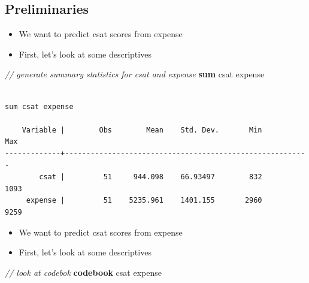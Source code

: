 \documentclass[]{book}
\newenvironment{Shaded}{\begin{snugshade}}{\end{snugshade}}
\newcommand{\CommentTok}[1]{\textcolor[rgb]{0.56,0.35,0.01}{\textit{#1}}}
\newcommand{\KeywordTok}[1]{\textcolor[rgb]{0.13,0.29,0.53}{\textbf{#1}}}
\newcommand{\NormalTok}[1]{#1}
\providecommand{\tightlist}{%
  \setlength{\itemsep}{0pt}\setlength{\parskip}{0pt}}
\begin{document}
\hypertarget{preliminaries}{%
\subsection{Preliminaries}\label{preliminaries}}

\begin{itemize}
\tightlist
\item
  We want to predict csat scores from expense
\item
  First, let's look at some descriptives
\end{itemize}

\begin{Shaded}
\begin{Highlighting}[]
  \CommentTok{// generate summary statistics for csat and expense}
  \KeywordTok{sum}\NormalTok{ csat expense}
\end{Highlighting}
\end{Shaded}

\begin{verbatim}

sum csat expense

    Variable |        Obs        Mean    Std. Dev.       Min        Max
-------------+---------------------------------------------------------
        csat |         51     944.098    66.93497        832       1093
     expense |         51    5235.961    1401.155       2960       9259
\end{verbatim}

\begin{itemize}
\tightlist
\item
  We want to predict csat scores from expense
\item
  First, let's look at some descriptives
\end{itemize}

\begin{Shaded}
\begin{Highlighting}[]
  \CommentTok{// look at codebok}
  \KeywordTok{codebook}\NormalTok{ csat expense}
\end{Highlighting}
\end{Shaded}
\end{document}
